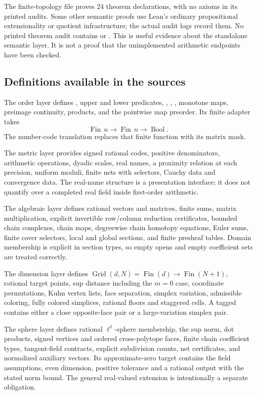 The finite-topology file proves 24 theorem declarations, with no axioms in its printed audits. Some other semantic proofs use Lean's ordinary propositional extensionality or quotient infrastructure; the actual audit logs record them. No printed theorem audit contains  or . This is useful evidence about the standalone semantic layer. It is not a proof that the unimplemented arithmetic endpoints have been checked.

\subsection{Definitions available in the sources}

The order layer defines , upper and lower predicates, , , , monotone maps, preimage continuity, products, and the pointwise map preorder. Its finite adapter takes
\[
 \operatorname{Fin}\,n\to\operatorname{Fin}\,n\to\operatorname{Bool}.
\]
The number-code translation replaces that finite function with its matrix mask.

The metric layer provides signed rational codes, positive denominators, arithmetic operations, dyadic scales, real names, a proximity relation at each precision, uniform moduli, finite nets with selectors, Cauchy data and convergence data. The real-name structure is a presentation interface; it does not quantify over a completed real field inside first-order arithmetic.

The algebraic layer defines rational vectors and matrices, finite sums, matrix multiplication, explicit invertible row/column reduction certificates, bounded chain complexes, chain maps, degreewise chain homotopy equations, Euler sums, finite cover selectors, local and global sections, and finite presheaf tables. Domain membership is explicit in section types, so empty opens and empty coefficient sets are treated correctly.

The dimension layer defines $\operatorname{Grid}(d,N)=
\operatorname{Fin}(d)\to\operatorname{Fin}(N+1)$, rational target points, sup distance including the $m=0$ case, coordinate permutations, Kuhn vertex lists, face separation, simplex variation, admissible coloring, fully colored simplices, rational floors and staggered cells. A tagged  contains either a close opposite-face pair or a large-variation simplex pair.

The sphere layer defines rational $\ell^1$-sphere membership, the sup norm, dot products, signed vertices and ordered cross-polytope faces, finite chain coefficient types, tangent-field contracts, explicit subdivision counts, net certificates, and normalized auxiliary vectors. Its approximate-zero target contains the field assumptions, even dimension, positive tolerance and a rational output with the stated norm bound. The general real-valued extension is intentionally a separate obligation.

